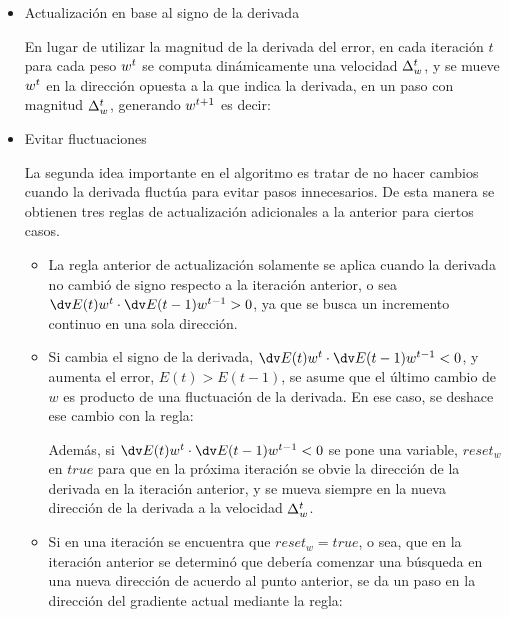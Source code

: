 \begin{itemize}
\item Actualización en base al signo de la derivada 

En lugar de utilizar la magnitud de la derivada del error, en cada iteración $t$ para cada peso $w^t$ se computa dinámicamente una velocidad $\Delta^{t}_w$, y se mueve $w^t$ en la dirección opuesta a la que indica la derivada, en un paso con magnitud $\Delta^{t}_w$, generando $w^{t+1}$ es decir: 


\item Evitar fluctuaciones 

La segunda idea importante en el algoritmo es tratar de no hacer cambios cuando la derivada fluctúa para evitar pasos innecesarios. De esta manera se obtienen tres reglas de actualización adicionales a la anterior para ciertos casos.

\begin{itemize}

\item La regla anterior de actualización solamente se aplica cuando la derivada no cambió de signo respecto a la iteración anterior, o sea $\multidv >0$, ya que se busca un incremento continuo en una sola dirección. 

\item Si cambia el signo de la derivada, $\multidv <0$, y aumenta el error, $E(t)>E(t-1)$, se asume que el último cambio de $w$ es producto de una fluctuación de la derivada. En ese caso, se deshace ese cambio con la regla:

\ma{
\dwt & \ass -\dwtm  \\
\wtp & \ass \wt + \dwt
}

Además, si $\multidv <0$ se pone una variable, $reset_w$ en $true$ para que en la próxima iteración se obvie la dirección de la derivada en la iteración anterior, y se mueva siempre en la nueva dirección de la derivada a la velocidad $\Delta^{t}_w$. 

\item Si en una iteración se encuentra que $reset_w=true$, o sea, que en la iteración anterior se determinó que debería comenzar una búsqueda en una nueva dirección de acuerdo al punto anterior, se da un paso en la dirección del gradiente actual mediante la regla:



\end{itemize}
\end{itemize}
